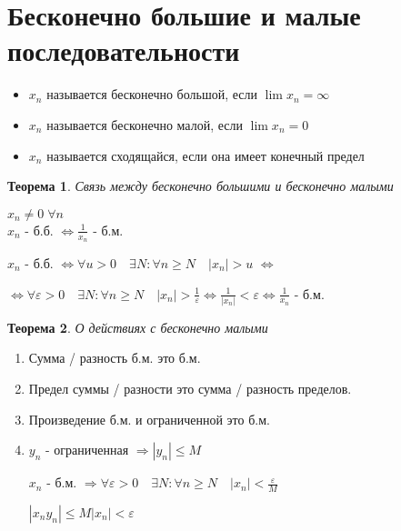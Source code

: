 \documentclass[12pt,letterpaper]{report}
\makeatletter
\newtheorem{theorem}{Теорема}
\renewenvironment{proof}[1][\proofname]{%
   \par\pushQED{\qed}\normalfont%
   \topsep6\p@\@plus6\p@\relax
   \trivlist\item[\hskip\labelsep\bfseries#1\@addpunct{.}]%
   \ignorespaces
}{%
   \popQED\endtrivlist\@endpefalse
}
\makeatother
\begin{document}
\section{Бесконечно большие и малые последовательности}
\begin{itemize}
    \item $x_n$ называется бесконечно большой, если $\lim x_n = \infty$
    \item $x_n$ называется бесконечно малой, если $\lim x_n = 0$
    \item $x_n$ называется сходящайся, если она имеет конечный предел
\end{itemize}
\vspace{0.7cm}
\begin{theorem} Связь между бесконечно большими и бесконечно малыми\end{theorem}
$x_n \neq 0\; \forall n$ \\
$x_n$ - б.б. $\Leftrightarrow \frac{1}{x_n}$ - б.м.
\begin{proof}
    $x_n$ - б.б. $\Leftrightarrow \forall u > 0\quad \exists N : \forall n \geqslant N\quad |x_n| > u$ $\Leftrightarrow$ 
    
    $\Leftrightarrow \forall \varepsilon > 0\quad \exists N : \forall n \geqslant N\quad |x_n| > \frac{1}{\varepsilon} \Leftrightarrow \frac{1}{|x_n|} < \varepsilon \Leftrightarrow \frac{1}{x_n}$ - б.м.
\end{proof}
\begin{theorem} О действиях с бесконечно малыми \end{theorem}
\begin{enumerate}
    \item Сумма / разность б.м. это б.м.
    \begin{proof}
        Предел суммы / разности это сумма / разность пределов. 
    \end{proof}
    \item Произведение б.м. и ограниченной это б.м.
    \begin{proof}
        $y_n$ - ограниченная $\Rightarrow |y_n| \leqslant M$ 
        
        $x_n$ - б.м. $\Rightarrow \forall \varepsilon > 0\quad \exists N : \forall n \geqslant N\quad |x_n| < \frac{\varepsilon}{M}$
        
        $|x_ny_n| \leqslant M|x_n| < \varepsilon$
    \end{proof}
\end{enumerate}
\end{document}
